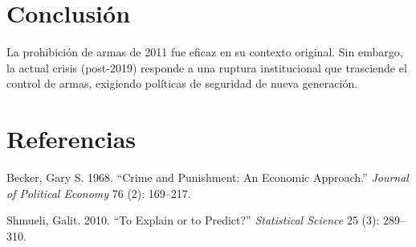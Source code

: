 \documentclass[12pt,spanish]{article}
\newlength{\cslhangindent}
\newlength{\csllabelwidth}
\newcommand{\citeproctext}{}
\newenvironment{CSLReferences}[2] 
 {\begin{list}{}{
  \setlength{\leftmargin}{\cslhangindent}
  \setlength{\parsep}{0pt}
  \setlength{\itemsep}{6pt}
  \ifodd #1
   \setlength{\leftmargin}{\leftmargin + \csllabelwidth}
   \setlength{\itemindent}{-\csllabelwidth}
  \fi
  }
  \renewcommand{\bibitem}[2][]{\item} %
 }
 {\end{list}}
\begin{document}
\section{Conclusión}\label{conclusiuxf3n}

La prohibición de armas de 2011 fue eficaz en su contexto original. Sin
embargo, la actual crisis (post-2019) responde a una ruptura
institucional que trasciende el control de armas, exigiendo políticas de
seguridad de nueva generación.

\section{Referencias}\label{referencias}

\protect{}\label{refs}
\begin{CSLReferences}{1}{1}
\bibitem[\citeproctext]{ref-becker1968}
Becker, Gary S. 1968. {``Crime and Punishment: An Economic Approach.''}
\emph{Journal of Political Economy} 76 (2): 169--217.

\bibitem[\citeproctext]{ref-shmueli2010}
Shmueli, Galit. 2010. {``To Explain or to Predict?''} \emph{Statistical
Science} 25 (3): 289--310.

\end{CSLReferences}
\end{document}
